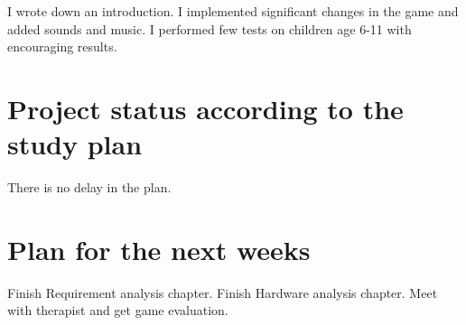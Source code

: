 \documentclass[10pt,a4paper]{article}
\begin{document}
I wrote down an introduction. I implemented significant changes in the game and added sounds and music. I performed few tests on children age 6-11 with encouraging results. 

\section*{Project status according to the study plan}
There is no delay in the plan.

\section*{Plan for the next weeks}
Finish Requirement analysis chapter. Finish Hardware analysis chapter. Meet with therapist and get game evaluation. 



\end{document}
